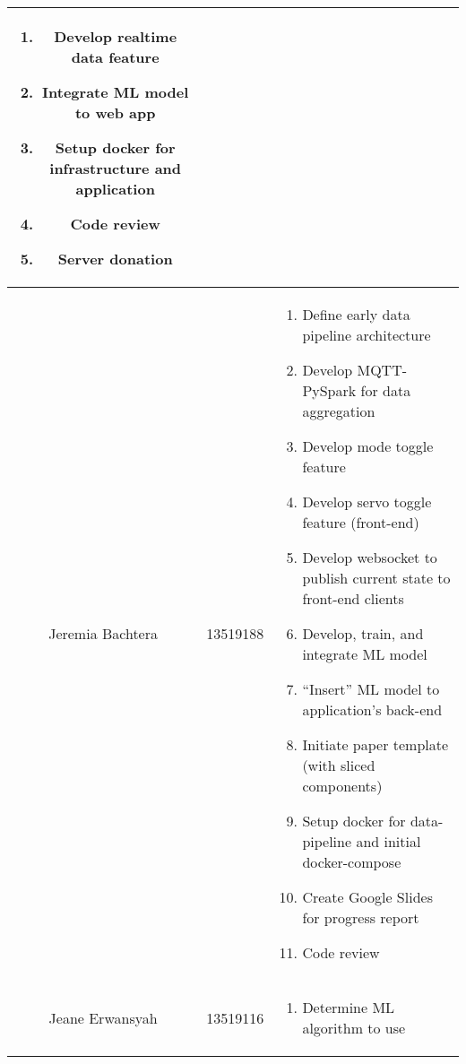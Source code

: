 \begin{table*}[htbp]
\begin{center}
\begin{tabular}{|c|c|p{10cm}|}
\begin{enumerate}[leftmargin=*]
				                                         \item Develop realtime data feature
				                                         \item Integrate ML model to web app
				                                         \item Setup docker for infrastructure and application
				                                         \item Code review
				                                         \item Server donation
			                                         \end{enumerate}
			\\
			\hline
			Jeremia Bachtera & 13519188            & \begin{enumerate}[leftmargin=*]
				                                         \item Define early data pipeline architecture
				                                         \item Develop MQTT-PySpark for data aggregation
				                                         \item Develop mode toggle feature
				                                         \item Develop servo toggle feature (front-end)
				                                         \item Develop websocket to publish current state to front-end clients
				                                         \item Develop, train, and integrate ML model
				                                         \item ``Insert'' ML model to application's back-end
				                                         \item Initiate paper template (with sliced components)
				                                         \item Setup docker for data-pipeline and initial docker-compose
				                                         \item Create Google Slides for progress report
				                                         \item Code review
			                                         \end{enumerate}
			\\
			\hline
			Jeane Erwansyah  & 13519116            & \begin{enumerate}[leftmargin=*]
				                                         \item Determine ML algorithm to use

\end{enumerate}
\end{tabular}
\end{center}
\end{table*}
